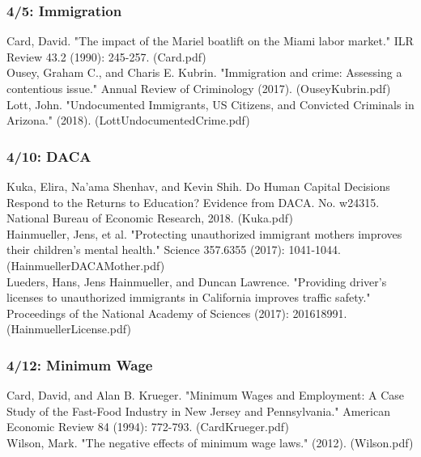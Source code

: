 \documentclass[12pt,letterpaper]{article}
\numberwithin{equation}{section}
\begin{document}
\subsubsection{4/5: Immigration}
\noindent Card, David. "The impact of the Mariel boatlift on the Miami labor market." ILR Review 43.2 (1990): 245-257. (Card.pdf) \\

\noindent Ousey, Graham C., and Charis E. Kubrin. "Immigration and crime: Assessing a contentious issue." Annual Review of Criminology  (2017). (OuseyKubrin.pdf)\\

\noindent Lott, John. "Undocumented Immigrants, US Citizens, and Convicted Criminals in Arizona." (2018). (LottUndocumentedCrime.pdf)\\

\subsubsection{4/10: DACA}
\noindent Kuka, Elira, Na'ama Shenhav, and Kevin Shih. Do Human Capital Decisions Respond to the Returns to Education? Evidence from DACA. No. w24315. National Bureau of Economic Research, 2018. (Kuka.pdf) \\

\noindent Hainmueller, Jens, et al. "Protecting unauthorized immigrant mothers improves their children’s mental health." Science 357.6355 (2017): 1041-1044. (HainmuellerDACAMother.pdf)\\

\noindent Lueders, Hans, Jens Hainmueller, and Duncan Lawrence. "Providing driver’s licenses to unauthorized immigrants in California improves traffic safety." Proceedings of the National Academy of Sciences (2017): 201618991. (HainmuellerLicense.pdf) \\

\subsubsection{4/12: Minimum Wage }

\noindent Card, David, and Alan B. Krueger. "Minimum Wages and Employment: A Case Study of the Fast-Food Industry in New Jersey and Pennsylvania." American Economic Review 84 (1994): 772-793. (CardKrueger.pdf) \\

\noindent Wilson, Mark. "The negative effects of minimum wage laws." (2012). (Wilson.pdf)\\
\end{document}
